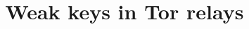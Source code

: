 \documentclass[letterpaper,twocolumn,10pt]{article}
\begin{document}
\title{\Large \bf Weak keys in Tor relays}

\author{}

\maketitle

\thispagestyle{empty}

















\balance
\printbibliography
\end{document}
